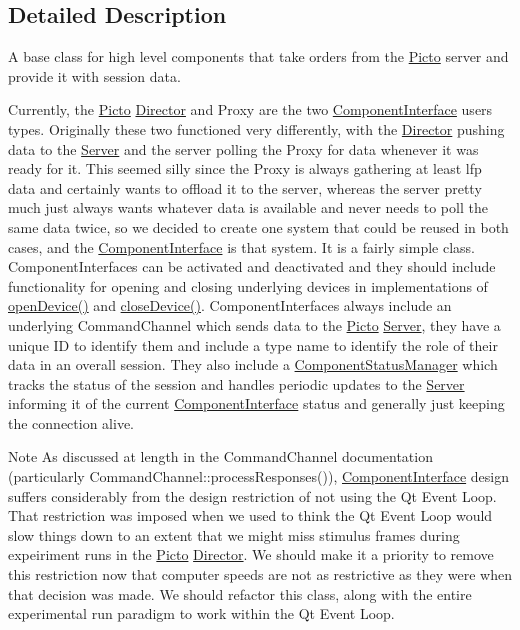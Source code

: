 \subsection{Detailed Description}
A base class for high level components that take orders from the \hyperlink{namespace_picto}{Picto} server and provide it with session data. 

Currently, the \hyperlink{namespace_picto}{Picto} \hyperlink{class_director}{Director} and Proxy are the two \hyperlink{class_component_interface}{Component\-Interface} users types. Originally these two functioned very differently, with the \hyperlink{class_director}{Director} pushing data to the \hyperlink{class_server}{Server} and the server polling the Proxy for data whenever it was ready for it. This seemed silly since the Proxy is always gathering at least lfp data and certainly wants to offload it to the server, whereas the server pretty much just always wants whatever data is available and never needs to poll the same data twice, so we decided to create one system that could be reused in both cases, and the \hyperlink{class_component_interface}{Component\-Interface} is that system. It is a fairly simple class. Component\-Interfaces can be activated and deactivated and they should include functionality for opening and closing underlying devices in implementations of \hyperlink{class_component_interface_a93b77c54abbcd8ea42afb9fd204049bd}{open\-Device()} and \hyperlink{class_component_interface_ab4433362fe7d1e5c09dc556e7105f775}{close\-Device()}. Component\-Interfaces always include an underlying Command\-Channel which sends data to the \hyperlink{namespace_picto}{Picto} \hyperlink{class_server}{Server}, they have a unique I\-D to identify them and include a type name to identify the role of their data in an overall session. They also include a \hyperlink{class_component_status_manager}{Component\-Status\-Manager} which tracks the status of the session and handles periodic updates to the \hyperlink{class_server}{Server} informing it of the current \hyperlink{class_component_interface}{Component\-Interface} status and generally just keeping the connection alive. \begin{DoxyNote}{Note}
As discussed at length in the Command\-Channel documentation (particularly Command\-Channel\-::process\-Responses()), \hyperlink{class_component_interface}{Component\-Interface} design suffers considerably from the design restriction of not using the Qt Event Loop. That restriction was imposed when we used to think the Qt Event Loop would slow things down to an extent that we might miss stimulus frames during expeiriment runs in the \hyperlink{namespace_picto}{Picto} \hyperlink{class_director}{Director}. We should make it a priority to remove this restriction now that computer speeds are not as restrictive as they were when that decision was made. We should refactor this class, along with the entire experimental run paradigm to work within the Qt Event Loop. 
\end{DoxyNote}
